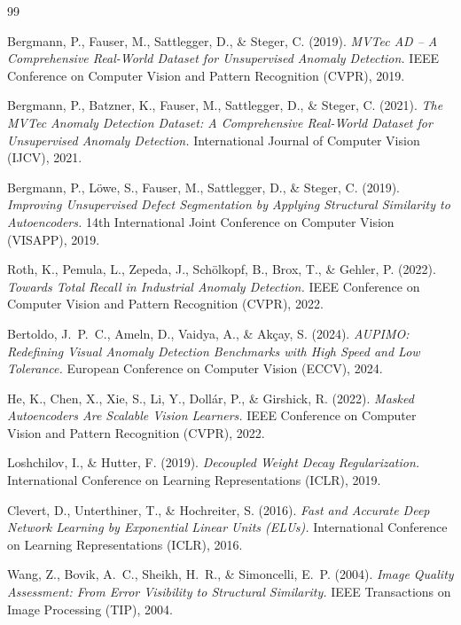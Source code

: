 \documentclass[11pt, a4paper]{article}
\begin{document}
\begin{thebibliography}{99}

Bergmann, P., Fauser, M., Sattlegger, D., \& Steger, C. (2019).
\textit{MVTec AD -- A Comprehensive Real-World Dataset for Unsupervised Anomaly Detection.}
IEEE Conference on Computer Vision and Pattern Recognition (CVPR), 2019.

Bergmann, P., Batzner, K., Fauser, M., Sattlegger, D., \& Steger, C. (2021).
\textit{The MVTec Anomaly Detection Dataset: A Comprehensive Real-World Dataset for Unsupervised Anomaly Detection.}
International Journal of Computer Vision (IJCV), 2021.

Bergmann, P., L{\"o}we, S., Fauser, M., Sattlegger, D., \& Steger, C. (2019).
\textit{Improving Unsupervised Defect Segmentation by Applying Structural Similarity to Autoencoders.}
14th International Joint Conference on Computer Vision (VISAPP), 2019.

Roth, K., Pemula, L., Zepeda, J., Sch{\"o}lkopf, B., Brox, T., \& Gehler, P. (2022).
\textit{Towards Total Recall in Industrial Anomaly Detection.}
IEEE Conference on Computer Vision and Pattern Recognition (CVPR), 2022.

Bertoldo, J.~P.~C., Ameln, D., Vaidya, A., \& Ak\c{c}ay, S. (2024).
\textit{AUPIMO: Redefining Visual Anomaly Detection Benchmarks with High Speed and Low Tolerance.}
European Conference on Computer Vision (ECCV), 2024.

He, K., Chen, X., Xie, S., Li, Y., Doll{\'a}r, P., \& Girshick, R. (2022).
\textit{Masked Autoencoders Are Scalable Vision Learners.}
IEEE Conference on Computer Vision and Pattern Recognition (CVPR), 2022.

Loshchilov, I., \& Hutter, F. (2019).
\textit{Decoupled Weight Decay Regularization.}
International Conference on Learning Representations (ICLR), 2019.

Clevert, D., Unterthiner, T., \& Hochreiter, S. (2016).
\textit{Fast and Accurate Deep Network Learning by Exponential Linear Units (ELUs).}
International Conference on Learning Representations (ICLR), 2016.

Wang, Z., Bovik, A.~C., Sheikh, H.~R., \& Simoncelli, E.~P. (2004).
\textit{Image Quality Assessment: From Error Visibility to Structural Similarity.}
IEEE Transactions on Image Processing (TIP), 2004.


\end{thebibliography}
\end{document}
